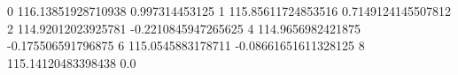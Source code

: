 0 116.13851928710938 0.997314453125
1 115.85611724853516 0.7149124145507812
2 114.92012023925781 -0.2210845947265625
4 114.9656982421875 -0.175506591796875
6 115.0545883178711 -0.08661651611328125
8 115.14120483398438 0.0
